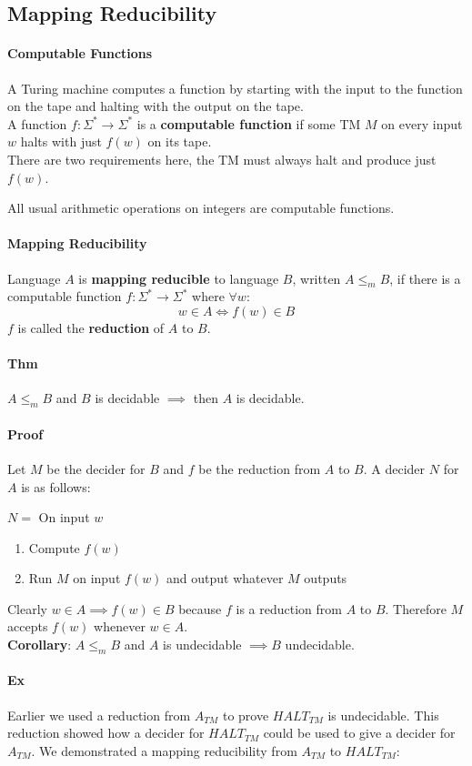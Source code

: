 \documentclass[12 pt]{article}
\begin{document}
\subsection{Mapping Reducibility}
\paragraph{Computable Functions}
A Turing machine computes a function by starting with the input to the
function on the tape and halting with the output on the tape.
\\ A function $f: \Sigma^* \to \Sigma^*$ is a \textbf{computable
  function} if some TM $M$ on every input $w$ halts with just $f(w)$
on its tape.
\\ There are two requirements here, the TM must always halt and
produce just $f(w)$.

All usual arithmetic operations on integers are computable functions.
\paragraph{Mapping Reducibility}
Language $A$ is \textbf{mapping reducible} to language $B$, written $A
\leq_m B$, if there is a computable function $f:\Sigma^* \to \Sigma^*$
where $\forall w$:
$$w \in A \iff f(w) \in B$$
$f$ is called the \textbf{reduction} of $A$ to $B$.
\paragraph{Thm}
$A \leq_m B$ and $B$ is decidable $\implies$ then $A$ is decidable.
\paragraph{Proof} Let $M$ be the decider for $B$ and $f$ be the
reduction from $A$ to $B$. A decider $N$ for $A$ is as follows:

$N = $ On input $w$
\begin{enumerate}
\item Compute $f(w)$
\item Run $M$ on input $f(w)$ and output whatever $M$ outputs
\end{enumerate}
Clearly $w \in A \implies f(w) \in B$ because $f$ is a reduction from
$A$ to $B$. Therefore $M$ accepts $f(w)$ whenever $w \in A$.
\\ \textbf{Corollary}: $A \leq_m B$ and $A$ is undecidable $\implies B$
undecidable.
\paragraph{Ex}
Earlier we used a reduction from $A_{TM}$ to prove $HALT_{TM}$ is
undecidable. This reduction showed how a decider for $HALT_{TM}$ could
be used to give a decider for $A_{TM}$. We demonstrated a mapping
reducibility from $A_{TM}$ to $HALT_{TM}$:
\end{document}
